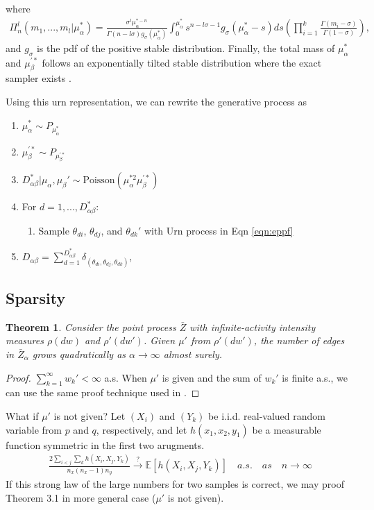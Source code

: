 \documentclass{article}
\newtheorem{theorem}{Theorem}[section]
\begin{document}
where
\begin{align}
\Pi_{n}^l(m_1, ..., m_l|\mu_\alpha^*) = \frac{\sigma^l \mu_\alpha^{*-n}}{\Gamma(n-l\sigma)g_{\sigma}(\mu_\alpha^*)} \int_{0}^{\mu_\alpha^*}s^{n-l\sigma-1}g_{\sigma}(\mu_\alpha^*-s)ds(\prod_{i=1}^{k} \frac{\Gamma(m_i-\sigma)}{\Gamma(1-\sigma)} ),
\end{align}
and $g_\sigma$ is the pdf of the positive stable distribution.
Finally, the total mass of $\mu_\alpha^*$ and $\mu_\beta^{'*}$ follows an exponentially tilted stable distribution where the exact sampler exists \citep{devroye2009random,hofert2011sampling}. 

Using this urn representation, we can rewrite the generative process as
\begin{enumerate}
\item $\mu_\alpha^* \sim P_{\mu_\alpha^*}$
\item $\mu_\beta^{'*} \sim P_{\mu_\beta^{'*}}$
\item $D_{\alpha\beta}^* | \mu_\alpha, \mu_\beta' \sim \text{Poisson}(\mu_\alpha^{*2}\mu_\beta^{'*})$
\item For $d=1,...,D_{\alpha\beta}^*$:
\begin{enumerate}
\item Sample $\theta_{di}$, $\theta_{dj}$, and $\theta_{dk}'$ with Urn process in Eqn \ref{eqn:eppf}
\end{enumerate}
\item $D_{\alpha\beta} = \sum_{d=1}^{D_{\alpha\beta}^*} \delta_{(\theta_{di}, \theta_{dj}, \theta_{dk})}$,
\end{enumerate}

\subsection{Sparsity}

\begin{theorem} Consider the point process $\bar{Z}$ with infinite-activity intensity measures $\rho(dw)$ and $\rho'(dw')$. Given $\mu'$ from $\rho'(dw')$, the number of edges in $\bar{Z}_{\alpha}$ grows quadratically as $\alpha \rightarrow \infty$ almost surely.
\end{theorem}
\begin{proof}
$\sum_{k=1}^{\infty} w_k' < \infty$ a.s. When $\mu'$ is given and the sum of $w_k'$ is finite a.s., we can use the same proof technique used in \cite{Caron2015}.
\end{proof}
What if $\mu'$ is not given? Let $(X_i)$ and $(Y_k)$ be i.i.d. real-valued random variable from $p$ and $q$, respectively, and let $h(x_1, x_2, y_1)$ be a measurable function symmetric in the first two arugments. 
\begin{align}
\frac{2 \sum_{i<j}\sum_{k} h(X_i, X_j, Y_k)}{n_x(n_x -1) n_y} \xrightarrow[]{?} \mathbb{E}[h(X_i, X_j, Y_k)]\quad a.s.\quad as \quad n\rightarrow \infty
\end{align}
If this strong law of the large numbers for two samples is correct, we may proof Theorem 3.1 in more general case ($\mu'$ is not given).
\end{document}
